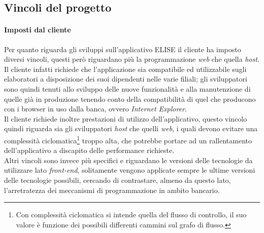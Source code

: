 \subsection{Vincoli del progetto}
\label{Vincoli del progetto}
	
	\paragraph{Imposti dal cliente}
	\leavevmode	\newline
	\leavevmode	\newline
	Per quanto riguarda gli sviluppi sull'applicativo ELISE il cliente ha imposto diversi vincoli, questi però riguardano più la programmazione \textit{web} che quella \textit{host}.\\
	
	Il cliente infatti richiede che l'applicazione sia compatibile ed utilizzabile sugli elaboratori a disposizione dei suoi dipendenti nelle varie filiali; gli sviluppatori sono quindi tenuti allo sviluppo delle nuove funzionalità e alla manutenzione di quelle già in produzione tenendo conto della compatibilità di quel che producono con i browser in uso dalla banca, ovvero \textit{Internet Explorer}.\\
	
	Il cliente richiede inoltre prestazioni di utilizzo dell'applicativo, questo vincolo quindi riguarda sia gli sviluppatori \textit{host} che quelli \textit{web}, i quali devono evitare una complessità ciclomatica\footnote{Con complessità ciclomatica si intende quella del flusso di controllo, il suo valore è funzione dei possibili differenti cammini sul grafo di flusso.} troppo alta, che potrebbe portare ad un rallentamento dell'applicativo a discapito delle performance richieste.\\

	Altri vincoli sono invece più specifici e riguardano le versioni delle tecnologie da utilizzare lato \textit{front-end}, solitamente vengono applicate sempre le ultime versioni delle tecnologie possibili, cercando di contrastare, almeno da questo lato, l'arretratezza dei meccanismi di programmazione in ambito bancario.

